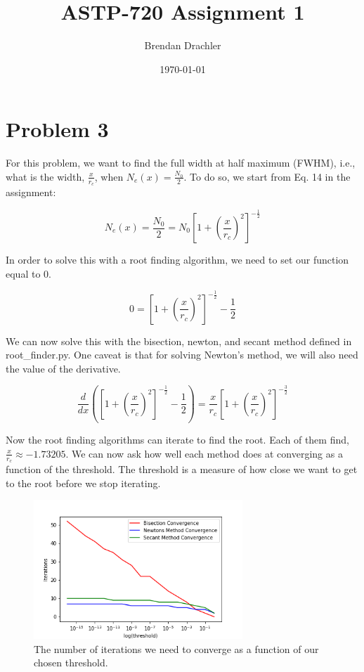 \documentclass[12pt, letterpaper]{article}
\title{ASTP-720 Assignment 1}
\author{Brendan Drachler}
\date{\today}
\begin{document}
\maketitle
\section*{Problem 3}
For this problem, we want to find the full width at half maximum (FWHM), i.e., what is the width, $\frac{x}{r_c}$, when $N_e(x) = \frac{N_0}{2}$. To do so, we start from Eq. 14 in the assignment:

\begin{equation}
N_e(x) = \frac{N_0}{2} = N_0 [1 + (\frac{x}{r_c})^2 ]^{-\frac{1}{2}}
\end{equation}

In order to solve this with a root finding algorithm, we need to set our function equal to $0$. 

\begin{equation}
0 = [1 + (\frac{x}{r_c})^2 ]^{-\frac{1}{2}} - \frac{1}{2}
\end{equation}

We can now solve this with the bisection, newton, and secant method defined in root\_finder.py. One caveat is that for solving Newton's method, we will also need the value of the derivative. 

\begin{equation}
\frac{d}{dx} ([1 + (\frac{x}{r_c})^2 ]^{-\frac{1}{2}} - \frac{1}{2}) = \frac{x}{r_c} [1 + (\frac{x}{r_c})^2 ]^{-\frac{3}{2}} 
\end{equation}

Now the root finding algorithms can iterate to find the root. Each of them find, $\frac{x}{r_c} \approx -1.73205$. We can now ask how well each method does at converging as a function of the threshold. The threshold is a measure of how close we want to get to the root before we stop iterating. 

\begin{figure}[h]
\caption{The number of iterations we need to converge as a function of our chosen threshold.}
\centering
\includegraphics[width=0.7\textwidth]{threshold_vs_iterations}
\end{figure}
\end{document}
